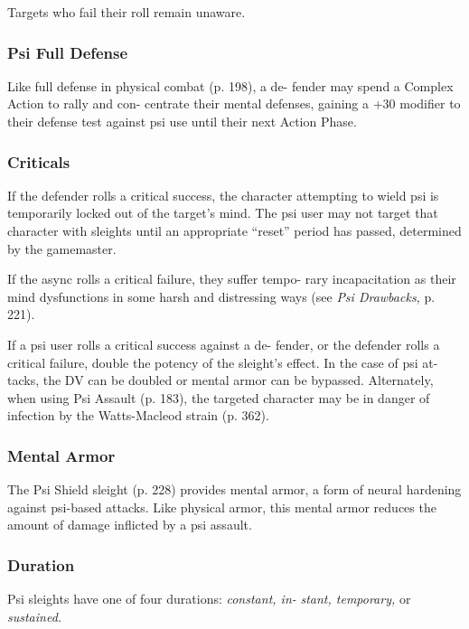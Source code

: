Targets who fail their roll remain unaware.

\subsubsection{Psi Full Defense}

Like full defense in physical combat (p. 198), a de-
fender may spend a Complex Action to rally and con-
centrate their mental defenses, gaining a +30 modifier 
to their defense test against psi use until their next 
Action Phase.

\subsubsection{Criticals}

If the defender rolls a critical success, the character 
attempting to wield psi is temporarily locked out of 
the target's mind. The psi user may not target that 
character with sleights until an appropriate ``reset'' 
period has passed, determined by the gamemaster.

If the async rolls a critical failure, they suffer tempo-
rary incapacitation as their mind dysfunctions in some 
harsh and distressing ways (see \textit{Psi Drawbacks,} p. 221).

If a psi user rolls a critical success against a de-
fender, or the defender rolls a critical failure, double 
the potency of the sleight's effect. In the case of psi at-
tacks, the DV can be doubled or mental armor can be 
bypassed. Alternately, when using Psi Assault (p. 183), 
the targeted character may be in danger of infection 
by the Watts-Macleod strain (p. 362).

\subsubsection{Mental Armor}

The Psi Shield sleight (p. 228) provides mental armor, 
a form of neural hardening against psi-based attacks. 
Like physical armor, this mental armor reduces the 
amount of damage inflicted by a psi assault.

\subsubsection{Duration}

Psi sleights have one of four durations: \textit{constant, in-}
\textit{stant, temporary,} or \textit{sustained.}

